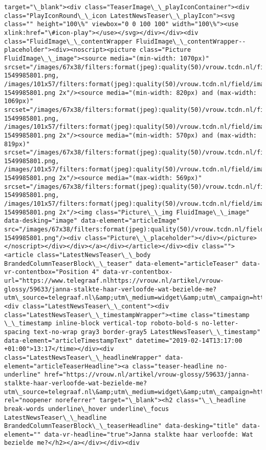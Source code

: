 \documentclass[11pt]{article}
\begin{document}
\begin{Verbatim}[commandchars=\\\{\}]
target="\_blank"><div class="TeaserImage\_\_playIconContainer"><div class="PlayIconRound\_\_icon LatestNewsTeaser\_\_playIcon"><svg class="" height="100\%" viewbox="0 0 100 100" width="100\%"><use xlink:href="\#icon-play"></use></svg></div></div><div class="FluidImage\_\_contentWrapper FluidImage\_\_contentWrapper--placeholder"><div><noscript><picture class="Picture FluidImage\_\_image"><source media="(min-width: 1070px)" srcset="/images/67x38/filters:format(jpeg):quality(50)/vrouw.tcdn.nl/field/image/47ffd6f480046a3ce149e086e74c485d-1549985801.png, /images/101x57/filters:format(jpeg):quality(50)/vrouw.tcdn.nl/field/image/47ffd6f480046a3ce149e086e74c485d-1549985801.png 2x"/><source media="(min-width: 820px) and (max-width: 1069px)" srcset="/images/67x38/filters:format(jpeg):quality(50)/vrouw.tcdn.nl/field/image/47ffd6f480046a3ce149e086e74c485d-1549985801.png, /images/101x57/filters:format(jpeg):quality(50)/vrouw.tcdn.nl/field/image/47ffd6f480046a3ce149e086e74c485d-1549985801.png 2x"/><source media="(min-width: 570px) and (max-width: 819px)" srcset="/images/67x38/filters:format(jpeg):quality(50)/vrouw.tcdn.nl/field/image/47ffd6f480046a3ce149e086e74c485d-1549985801.png, /images/101x57/filters:format(jpeg):quality(50)/vrouw.tcdn.nl/field/image/47ffd6f480046a3ce149e086e74c485d-1549985801.png 2x"/><source media="(max-width: 569px)" srcset="/images/67x38/filters:format(jpeg):quality(50)/vrouw.tcdn.nl/field/image/47ffd6f480046a3ce149e086e74c485d-1549985801.png, /images/101x57/filters:format(jpeg):quality(50)/vrouw.tcdn.nl/field/image/47ffd6f480046a3ce149e086e74c485d-1549985801.png 2x"/><img class="Picture\_\_img FluidImage\_\_image" data-desking="image" data-element="articleImage" src="/images/67x38/filters:format(jpeg):quality(50)/vrouw.tcdn.nl/field/image/47ffd6f480046a3ce149e086e74c485d-1549985801.png"/><div class="Picture\_\_placeholder"></div></picture></noscript></div></div></a></div></article></div><div class=""><article class="LatestNewsTeaser\_\_body BrandedColumnTeaserBlock\_\_teaser" data-element="articleTeaser" data-vr-contentbox="Position 4" data-vr-contentbox-url="https://www.telegraaf.nlhttps://vrouw.nl/artikel/vrouw-glossy/59633/janna-stalkte-haar-verloofde-wat-bezielde-me?utm\_source=telegraaf.nl\&amp;utm\_medium=widget\&amp;utm\_campaign=https://www.telegraaf.nl/"><div class="LatestNewsTeaser\_\_content"><div class="LatestNewsTeaser\_\_timestampWrapper"><time class="timestamp \_\_timestamp inline-block vertical-top roboto-bold-s no-letter-spacing text-no-wrap gray3 border-gray5 LatestNewsTeaser\_\_timestamp" data-element="articleTimestampText" datetime="2019-02-14T13:17:00 +01:00">13:17</time></div><div class="LatestNewsTeaser\_\_headlineWrapper" data-element="articleTeaserHeadline"><a class="teaser-headline no-underline" href="https://vrouw.nl/artikel/vrouw-glossy/59633/janna-stalkte-haar-verloofde-wat-bezielde-me?utm\_source=telegraaf.nl\&amp;utm\_medium=widget\&amp;utm\_campaign=https://www.telegraaf.nl/" rel="noopener noreferrer" target="\_blank"><h2 class="\_\_headline break-words underline\_hover underline\_focus LatestNewsTeaser\_\_headline BrandedColumnTeaserBlock\_\_teaserHeadline" data-desking="title" data-element="" data-vr-headline="true">Janna stalkte haar verloofde: Wat bezielde me?</h2></a></div></div><div 
\end{Verbatim}
\end{document}
